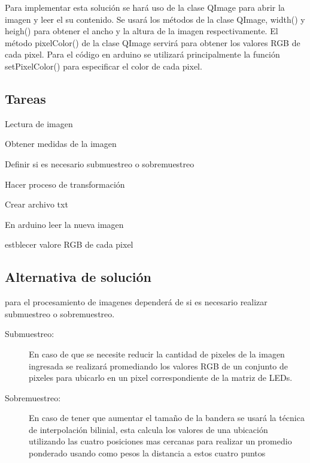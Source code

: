 \documentclass{article}
\begin{document}
Para implementar esta solución se hará uso de la clase QImage para abrir la imagen y leer el su contenido. Se usará los métodos de la clase QImage, width() y heigh() para obtener el ancho y la altura de la imagen respectivamente. El método pixelColor() de la clase QImage servirá para obtener los valores RGB de cada pixel.
Para el código en arduino se utilizará principalmente la función setPixelColor() para especificar el color de cada pixel.

\subsection{Tareas}

\begin{description}
   \item Lectura de imagen
   \item Obtener medidas de la imagen
   \item Definir si es necesario submuestreo o sobremuestreo
   \item Hacer proceso de transformación
   \item Crear archivo txt
   \item En arduino leer la nueva imagen
   \item estblecer valore RGB de cada pixel
   
\end{description}

\subsection{Alternativa de solución}

para el procesamiento de imagenes dependerá de si es necesario realizar submuestreo o sobremuestreo.

\begin{description}
   \item[Submuestreo:] En caso de que se necesite reducir la cantidad de pixeles de la imagen ingresada se realizará promediando los valores RGB de un conjunto de pixeles para ubicarlo en un pixel correspondiente de la matriz de LEDs.
   \item[Sobremuestreo:] En caso de tener que aumentar el tamaño de la bandera se usará la técnica de interpolación bilinial, esta calcula los valores de una ubicación utilizando las cuatro posiciones mas cercanas para realizar un promedio ponderado usando como pesos la distancia a estos cuatro puntos
\end{description}
\end{document}
